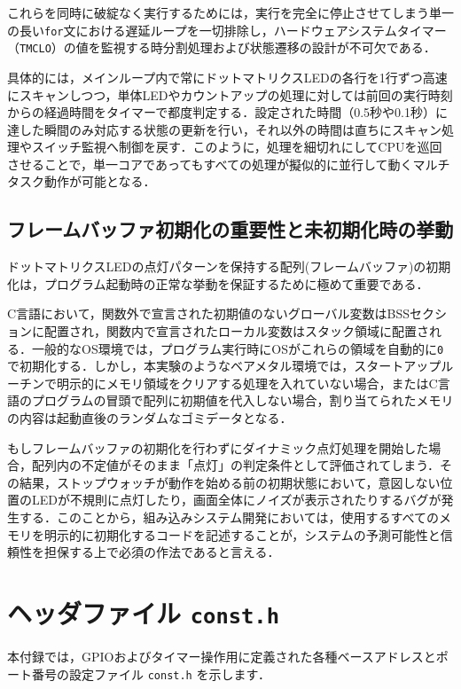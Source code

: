 \documentclass{jlreq}
\begin{document}
  これらを同時に破綻なく実行するためには，実行を完全に停止させてしまう単一の長い\texttt{for}文における遅延ループを一切排除し，ハードウェアシステムタイマー（\texttt{TMCLO}）の値を監視する時分割処理および状態遷移の設計が不可欠である．

  具体的には，メインループ内で常にドットマトリクスLEDの各行を1行ずつ高速にスキャンしつつ，単体LEDやカウントアップの処理に対しては前回の実行時刻からの経過時間をタイマーで都度判定する．設定された時間（0.5秒や0.1秒）に達した瞬間のみ対応する状態の更新を行い，それ以外の時間は直ちにスキャン処理やスイッチ監視へ制御を戻す．このように，処理を細切れにしてCPUを巡回させることで，単一コアであってもすべての処理が擬似的に並行して動くマルチタスク動作が可能となる．

  \subsection{フレームバッファ初期化の重要性と未初期化時の挙動}
  ドットマトリクスLEDの点灯パターンを保持する配列(フレームバッファ)の初期化は，プログラム起動時の正常な挙動を保証するために極めて重要である．

  C言語において，関数外で宣言された初期値のないグローバル変数はBSSセクションに配置され，関数内で宣言されたローカル変数はスタック領域に配置される．一般的なOS環境では，プログラム実行時にOSがこれらの領域を自動的に\texttt{0}で初期化する．しかし，本実験のようなベアメタル環境では，スタートアップルーチンで明示的にメモリ領域をクリアする処理を入れていない場合，またはC言語のプログラムの冒頭で配列に初期値を代入しない場合，割り当てられたメモリの内容は起動直後のランダムなゴミデータとなる．

  もしフレームバッファの初期化を行わずにダイナミック点灯処理を開始した場合，配列内の不定値がそのまま「点灯」の判定条件として評価されてしまう．その結果，ストップウォッチが動作を始める前の初期状態において，意図しない位置のLEDが不規則に点灯したり，画面全体にノイズが表示されたりするバグが発生する．このことから，組み込みシステム開発においては，使用するすべてのメモリを明示的に初期化するコードを記述することが，システムの予測可能性と信頼性を担保する上で必須の作法であると言える．

  \appendix
  \section{ヘッダファイル \texttt{const.h}}
  本付録では，GPIOおよびタイマー操作用に定義された各種ベースアドレスとポート番号の設定ファイル \texttt{const.h} を示します．
\end{document}
